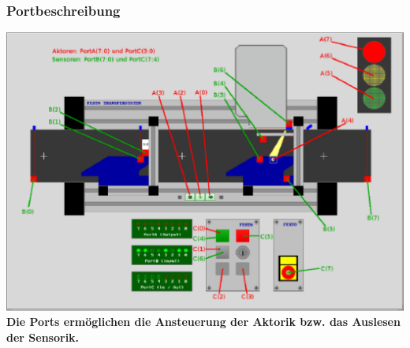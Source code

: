 \documentclass[oneside,a4paper,titlepage]{scrartcl} %
\begin{document}
\subsubsection{Portbeschreibung}
\includegraphics[scale=.5]{imgs/Portbeschreibung.PNG}
\newpage
\textbf{Die Ports ermöglichen die Ansteuerung der Aktorik bzw. das Auslesen der Sensorik.\newline}
\end{document}
